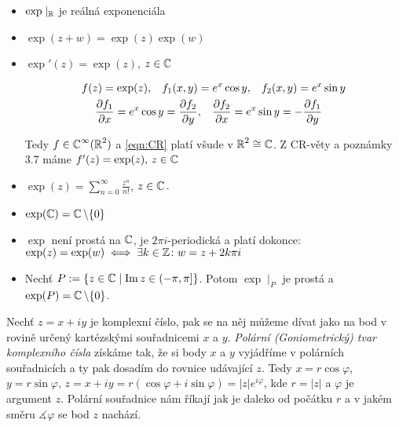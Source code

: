 \begin{properties}
\mbox{}
\vspace{-2em}
\begin{itemize}    
    \item $\exp \mid_{\operatorname{\mathbb{R}}} $ je reálná exponenciála 
    \item $\exp(z+w)=\exp(z)\exp(w)$
    \item $\exp'(z)=\exp(z)$, $ z \in\operatorname{\mathbb{C}}  $
 
 \begin{equation*}
 \begin{aligned}
    f(z) = \exp(z), \hspace{3mm}
    f_1(x,y) &=e^x \cos y, \hspace{3mm}
    f_2(x,y) =e^x\sin y\\
    \frac{\partial f_1}{\partial x} = e^x\cos y = \frac{\partial f_2}{\partial y}&, \hspace{3mm}
     \frac{\partial f_2}{\partial x} = e^x \sin y= - \frac{\partial f_1}{\partial y}
\end{aligned}
\end{equation*}
   
     
     
     
    Tedy $f\in\operatorname{\mathbb{C}}^{\infty}(\operatorname{\mathbb{R}} ^2)$ %
    a \cref{eqn:CR} platí všude v $\operatorname{\mathbb{R}} ^2\cong\operatorname{\mathbb{C}}  $. Z CR-věty a poznámky 3.7 máme $f'(z)=\exp(z)\text{, } z\in\operatorname{\mathbb{C}}  $
    \item $\exp(z)=\sum_{n=0}^{\infty}\frac{z^n}{n!}$, $z\in\operatorname{\mathbb{C}}  \text{.}$
    \item $\exp(\operatorname{\mathbb{C}}  )=\operatorname{\mathbb{C}}  \setminus\{0\}$ 
    \item $\exp$ není prostá na $\operatorname{\mathbb{C}}  $, je $2\pi i$-periodická a platí dokonce:
    \newline
    $\exp(z) =\exp(w) \iff\exists k \in\operatorname{\mathbb{Z}} \colon w=z+2k\pi i$
     \item Nechť $P:=\{z\in\operatorname{\mathbb{C}}  \mid \operatorname{Im} z \in \left (-\pi,\pi\right ]\}$.
     Potom $\exp\mid_P$ je prostá a $\exp(P)=\operatorname{\mathbb{C}}  \setminus\{0\}$.
    \newline
  \end{itemize}  
  \end{properties}
  \begin{note}
    Nechť $z=x+iy$ je komplexní číslo, pak se na něj můžeme dívat jako na bod v rovině určený kartézskými souřadnicemi $x$ a $y$. \emph{Polární (Goniometrický) tvar komplexního čísla} získáme tak, že si body $x$ a $y$ vyjádříme v polárních souřadnicích a ty pak dosadím do rovnice udávající $z$. Tedy
       $x=r\cos \varphi$, 
       $y=r\sin \varphi$, 
       $z=x+iy=r(\cos \varphi + i \sin \varphi)=\lvert z \rvert e^{i\varphi} $, kde $r=\lvert z \rvert$ a $\varphi$ je argument $z$.
       Polární souřadnice nám říkají jak je daleko od počátku $r$ a v jakém směru  $\measuredangle \varphi$ se bod $z$ nachází.
 \end{note}
     
